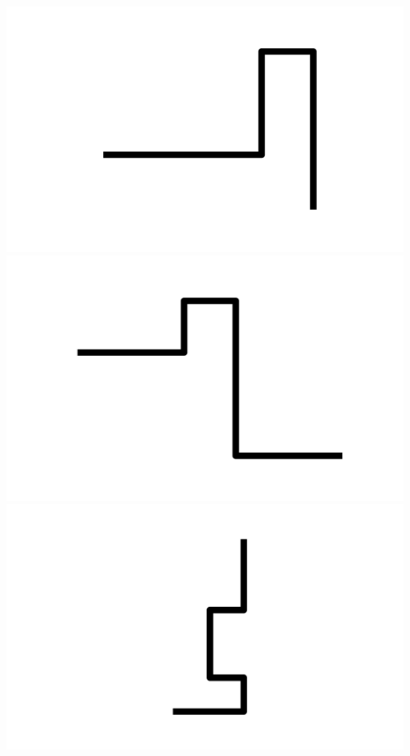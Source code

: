 \documentclass[]{report}
\begin{document}
\includegraphics[scale=.1]{pictures/21/state_cluster_shapes_490.pdf} 
\includegraphics[scale=.1]{pictures/21/state_cluster_shapes_491.pdf} 
\includegraphics[scale=.1]{pictures/21/state_cluster_shapes_492.pdf} 
\end{document}
